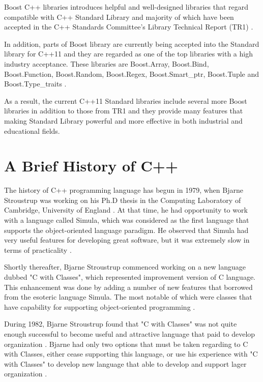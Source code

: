 \documentclass[11pt]{report}
\begin{document}
Boost C++ libraries introduces helpful and well-designed libraries that regard compatible with C++ Standard Library \cite{Deitel:2012:CPP} and majority of which have been accepted in the C++ Standards Committee's Library Technical Report (TR1) \cite{Boost:2007:Cpp}.

In addition, parts of Boost library are currently being accepted into the Standard library for C++11 \cite{Boost:2007:Cpp} and they are regarded as one of the top libraries with a high industry acceptance. These libraries are Boost.Array, Boost.Bind, Boost.Function, Boost.Random, Boost.Regex, Boost.Smart\_ptr, Boost.Tuple and Boost.Type\_traits \cite{Deitel:2012:CPP}.

As a result, the current C++11 Standard libraries include several more Boost libraries in addition to those from TR1 and they provide many features that making Standard Library powerful and more effective in both industrial and educational fields.


\section{A Brief History of C++}
\label{sec: History of C++}
The history of C++ programming language has begun in 1979, when Bjarne Stroustrup was working on his Ph.D thesis in the Computing Laboratory of Cambridge, University of England \cite{StroustrupHistory}. At that time, he had opportunity to work with a language called Simula, which was considered as the first language that supports the object-oriented language paradigm. He observed that Simula had very useful features for developing great software, but it was extremely slow in terms of practicality \cite{Stroustrup:2012:Cpp11}.

Shortly thereafter, Bjarne Stroustrup commenced working on a new language dubbed "C with Classes", which represented improvement version of C language. This enhancement was done by adding a number of new features that borrowed from the esoteric language Simula. The most notable of which were classes that have capability for supporting object-oriented programming \cite{StroustrupHistory}. 

During 1982, Bjarne Stroustrup found that "C with Classes" was not quite enough successful to become useful and attractive language that paid to develop organization \cite{StroustrupHistory}. Bjarne had only two options that must be taken regarding to C with Classes, either cease supporting this language, or use his experience with "C with Classes" to develop new language that able to develop and support lager organization \cite{Stroustrup:1994:DesignEvolution}.
\end{document}
